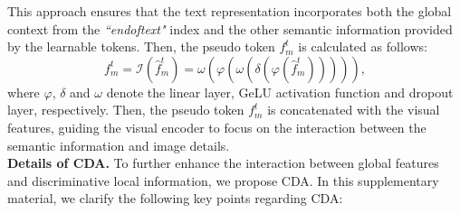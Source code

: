 %
This approach ensures that the text representation incorporates both the global context from the \textit{“endoftext"} index and the other semantic information provided by the learnable tokens.
%
Then, the pseudo token ${f}^{t}_{m}$ is calculated as follows:
\begin{equation}
    {f}^{t}_{m} = \mathcal{I}(\hat{f}^{t}_{m}) = \omega (\varphi (\omega (\delta (\varphi (\hat{f}^{t}_{m}))))),
\end{equation}
where $\varphi$, $\delta$ and $\omega$ denote the linear layer, GeLU activation function and dropout layer, respectively.
%
Then, the pseudo token ${f}^{t}_{m}$ is concatenated with the visual features, guiding the visual encoder to focus on the interaction between the semantic information and image details.
%
\\
\textbf{Details of CDA.}
To further enhance the interaction between global features and discriminative local information, we propose CDA.
%
In this supplementary material, we clarify the following key points regarding CDA:
%
